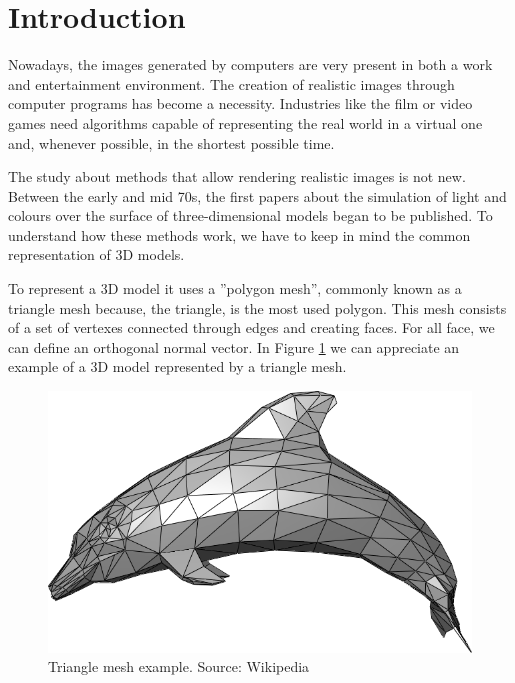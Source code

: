 \documentclass[titlepage,12pt]{article}
\begin{document}
\iftrue

\newpage
\tableofcontents*
\fi

\newpage

\section{Introduction} \label{introduction}

Nowadays, the images generated by computers are very present in both a work and entertainment environment. The creation of realistic images through computer programs has become a necessity. Industries like the film or video games need algorithms capable of representing the real world in a virtual one and, whenever possible, in the shortest possible time.

The study about methods that allow rendering realistic images is not new. Between the early and mid 70s, the first papers about the simulation of light and colours over the surface of three-dimensional models began to be published. To understand how these methods work, we have to keep in mind the common representation of 3D models.

To represent a 3D model it uses a ''polygon mesh'', commonly known as a triangle mesh because, the triangle, is the most used polygon. This mesh consists of a set of vertexes connected through edges and creating faces.  For all face, we can define an orthogonal normal vector. In Figure \ref{dolphin} we can appreciate an example of a 3D model represented by a triangle mesh.

\begin{figure}[H]
	\centering
	\includegraphics[scale=0.15]{media/Dolphin_triangle_mesh.png}
	\caption{Triangle mesh example. Source: Wikipedia}
	\label{dolphin}
\end{figure}
\end{document}
